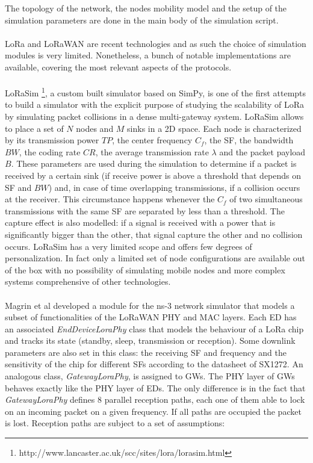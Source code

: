 The topology of the network, the nodes mobility model and the setup of the simulation parameters are done in the main body of the simulation script.  \\\\
LoRa and LoRaWAN are recent technologies and as such the choice of simulation modules is very limited. Nonetheless, a bunch of notable implementations are available, covering the most relevant aspects of the protocols. \\\\
LoRaSim \footnote{http://www.lancaster.ac.uk/scc/sites/lora/lorasim.html}, a custom built simulator based on SimPy, is one of the first attempts to build a simulator with the explicit purpose of studying the scalability of LoRa by simulating packet collisions in a dense multi-gateway system. LoRaSim allows to place a set of $N$ nodes and $M$ sinks in a 2D space. Each node is characterized by its transmission power $TP$, the center frequency $C_f$, the \gls{SF}, the bandwidth $BW$, the coding rate $CR$, the average transmission rate $\lambda$ and the packet payload $B$. These parameters are used during the simulation to determine if a packet is received by a certain sink (if receive power is above a threshold that depends on \gls{SF} and $BW$) and, in case of time overlapping transmissions, if a collision occurs at the receiver. This circumstance happens whenever the $C_f$ of two simultaneous transmissions with the same \gls{SF} are separated by less than a threshold. The capture effect is also modelled: if a signal is received with a power that is significantly bigger than the other, that signal capture the other and no collision occurs. LoRaSim has a very limited scope and offers few degrees of personalization. In fact only a limited set of node configurations are available out of the box with no possibility of simulating mobile nodes and more complex systems comprehensive of other technologies. \\ \\
Magrin et al \cite{ref:soa-lora-scal5} developed a module for the ns-3 network simulator that models a subset of functionalities of the LoRaWAN PHY and MAC layers. Each \gls{ED} has an associated \textit{EndDeviceLoraPhy} class that models the behaviour of a LoRa chip and tracks its state (standby, sleep, transmission or reception). Some downlink parameters are also set in this class: the receiving \gls{SF} and frequency and the sensitivity of the chip for different \glspl{SF} according to the datasheet of SX1272. An analogous class, \textit{GatewayLoraPhy}, is assigned to \glspl{GW}. The PHY layer of \glspl{GW} behaves exactly like the PHY layer of \glspl{ED}. The only difference is in the fact that \textit{GatewayLoraPhy} defines 8 parallel reception paths, each one of them able to lock on an incoming packet on a given frequency. If all paths are occupied the packet is lost. Reception paths are subject to a set of assumptions:

